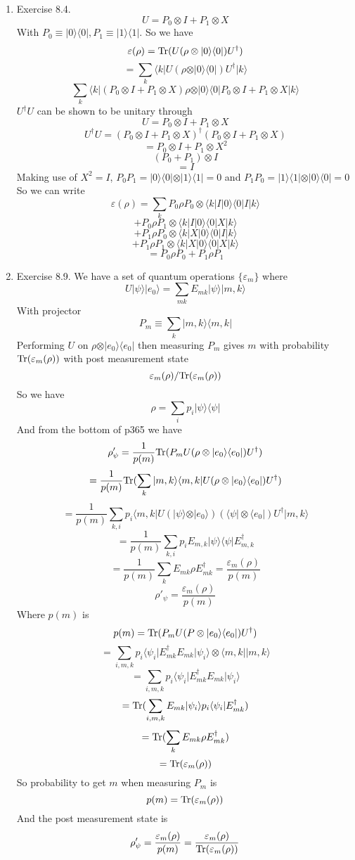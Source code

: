 \documentclass[12pt]{article}
\newcommand{\Tr}{{\rm Tr}}
\newcommand{\ket}[1]{\vert{#1}\rangle}
\newcommand{\bra}[1]{\langle{#1}\vert}
\begin{document}
\begin{enumerate}
    \item Exercise 8.4. 
    $$ U = P_0 \otimes I + P_1 \otimes X$$ 
    With $P_0 \equiv \ket{0} \bra{0}, P_1 \equiv \ket{1} \bra{1} $. So we have 
    $$ \varepsilon(\rho) = \Tr(U ( \rho \otimes \ket{0} \bra{0} ) U^{\dagger} ) $$
    $$ = \sum_k \bra{k} U ( \rho \otimes \ket{0} \bra{0} ) U^{\dagger}  \ket{k} $$
    $$ \sum_k \bra{k} ( P_0 \otimes I + P_1 \otimes X) \rho \otimes \ket{0} \bra{0} P_0 \otimes I + P_1 \otimes X \ket{k} $$
    $U^{\dagger} U$ can be shown to be unitary through 
    $$ U = P_0 \otimes I + P_1 \otimes X$$
    $$ U^{\dagger} U = ( P_0 \otimes I + P_1 \otimes X)^{\dagger} ( P_0 \otimes I + P_1 \otimes X) $$
    $$ = P_0 \otimes I + P_1 \otimes X^2 $$
    $$ (P_0 + P_1) \otimes I $$
    $$ = I $$
    Making use of $X^2 = I$, $P_0 P_1 = \ket{0} \bra{0} \otimes \ket{1} \bra{1} = 0 $ and $P_1 P_0 = \ket{1} \bra{1} \otimes \ket{0} \bra{0} = 0$ 
    So we can write 
    $$ \varepsilon (\rho) = \sum_k P_0 \rho P_0 \otimes \bra{k} I \ket{0} \bra{0} I \ket{k} $$
    $$ + P_0 \rho P_1 \otimes \bra{k} I \ket{0} \bra{0} X \ket{k} $$ 
    $$ + P_1 \rho P_0 \otimes \bra{k} X \ket{0} \bra{0} I \ket{k} $$
    $$ + P_1 \rho P_1 \otimes \bra{k} X \ket{0} \bra{0} X \ket{k} $$
    $$ = P_0 \rho P_0 + P_1 \rho P_1 $$

    \item Exercise 8.9. We have a set of quantum operations $\{ \varepsilon_m \} $ where
    $$ U \ket{\psi} \ket{e_0} = \sum_{mk} E_{mk} \ket{\psi} \ket{m,k} $$
    With projector 
    $$ P_m \equiv \sum_k \ket{m,k} \bra{m,k} $$
    Performing $U$ on $ \rho \otimes \ket{e_0} \bra{e_0}$ then measuring $P_m$ gives $m$ with probability $\Tr( \varepsilon_m (\rho))$ with post measurement state 
    $$ \varepsilon_m (\rho) / \Tr(\varepsilon_m (\rho)) $$
    So we have 
    $$ \rho = \sum_i p_i \ket{\psi} \bra{\psi} $$ 
    And from the bottom of p365 we have 
    $$ \rho'_{\psi} = \frac{1}{p(m)} \Tr(P_m U ( \rho \otimes \ket{e_0} \bra{e_0} ) U^{\dagger}) $$
    $$ = \frac{1}{p(m)} \Tr ( \sum_k \ket{m,k} \bra{m,k} U ( \rho \otimes \ket{e_0} \bra{e_0} ) U^{\dagger} ) $$
    $$ = \frac{1}{p(m)} \sum_{k,i} p_i \bra{m,k} U ( \ket{\psi} \otimes \ket{e_0})( \bra{\psi} \otimes \bra{e_0} ) U^{\dagger} \ket{m,k} $$
    $$ = \frac{1}{p(m)} \sum_{k,i} p_i E_{m,k} \ket{\psi} \bra{\psi} E^{\dagger}_{m,k} $$
    $$ = \frac{1}{p(m)} \sum_k E_{mk} \rho E^{\dagger}_{mk} = \frac{\varepsilon_m (\rho)}{p(m)} $$
    $$ \rho'_{\psi} = \frac{\varepsilon_m (\rho)}{p(m)} $$ 
    Where $p(m)$ is 
    $$ p(m) = \Tr( P_m U ( P \otimes \ket{e_0} \bra{e_0}) U^{\dagger} ) $$
    $$ = \sum_{i,m,k} p_i \bra{\psi_i} E_{mk}^{\dagger} E_{mk} \ket{\psi_i} \otimes \bra{m,k} \ket{m,k} $$
    $$ = \sum_{i,m,k} p_i \bra{\psi_i} E^{\dagger}_{mk} E_{mk} \ket{\psi_i} $$
    $$ = \Tr( \sum_{i,m,k} E_{mk} \ket{\psi_i} p_i \bra{\psi_i} E^{\dagger}_{mk}) $$
    $$ = \Tr( \sum_k E_{mk} \rho E_{mk}^{\dagger}) $$
    $$ = \Tr( \varepsilon_m (\rho)) $$
    So probability to get $m$ when measuring $P_m$ is 
    $$ p(m) = \Tr( \varepsilon_m (\rho)) $$
    And the post measurement state is 
    $$ \rho'_{\psi} = \frac{\varepsilon_m (\rho)}{p(m)} = \frac{\varepsilon_m (\rho)} {\Tr( \varepsilon_m (\rho)) }$$


\end{enumerate}
\end{document}
